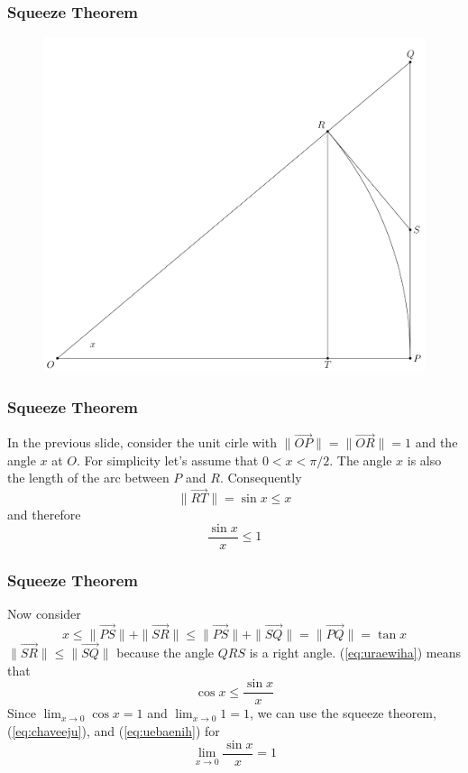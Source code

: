 \documentclass[xcolor=dvipsnames]{beamer}
\begin{document}
\begin{frame}
  \frametitle{Squeeze Theorem}
\begin{figure}[h]
\includegraphics[scale=.2]{./limsinxoverx.png}
\end{figure}
\end{frame}

\begin{frame}
  \frametitle{Squeeze Theorem}
  In the previous slide, consider the unit cirle with
  $\|\vec{OP}\|=\|\vec{OR}\|=1$ and the angle $x$ at $O$. For simplicity let's
  assume that $0<x<\pi/2$. The angle $x$ is also the length of the arc
  between $P$ and $R$. Consequently
  \begin{equation}
    \label{eq:iufoobue}
\|\vec{RT}\|=\sin{}x\leq{}x    
  \end{equation}
  and therefore
  \begin{equation}
    \label{eq:chaveeju}
    \frac{\sin{}x}{x}\leq{}1
  \end{equation}
\end{frame}

\begin{frame}
  \frametitle{Squeeze Theorem}
  Now consider
  \begin{equation}
    \label{eq:uraewiha}
    x\leq\|\vec{PS}\|+\|\vec{SR}\|\leq\|\vec{PS}\|+\|\vec{SQ}\|=\|\vec{PQ}\|=\tan{}x
  \end{equation}
$\|\vec{SR}\|\leq\|\vec{SQ}\|$ because the angle $QRS$ is a right angle.
(\ref{eq:uraewiha}) means that
\begin{equation}
  \label{eq:uebaenih}
  \cos{}x\leq\frac{\sin{}x}{x}
\end{equation}
Since $\lim_{x\rightarrow{}0}\cos{}x=1$ and $\lim_{x\rightarrow{}0}1=1$, we can use the squeeze
theorem, (\ref{eq:chaveeju}), and (\ref{eq:uebaenih}) for
\begin{equation}
  \label{eq:guabighe}
  \lim_{x\rightarrow{}0}\frac{\sin{}x}{x}=1
\end{equation}
\end{frame}
\end{document}
